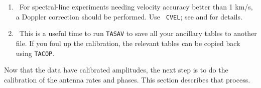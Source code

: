 \begin{enumerate}
\item\ {For spectral-line experiments needing velocity accuracy better
than 1 km/s, a Doppler correction should be performed.  Use {\tt
CVEL}; see  and  for details.}

\item\ {This is a useful time to run {\tt TASAV} to save all your
ancillary tables to another file.  If you foul up the calibration, the
relevant tables can be copied back using {\tt TACOP}\@.}

\end{enumerate}


Now that the data have calibrated amplitudes, the next step is to do
the calibration of the antenna rates and phases.  This
section describes that process.


